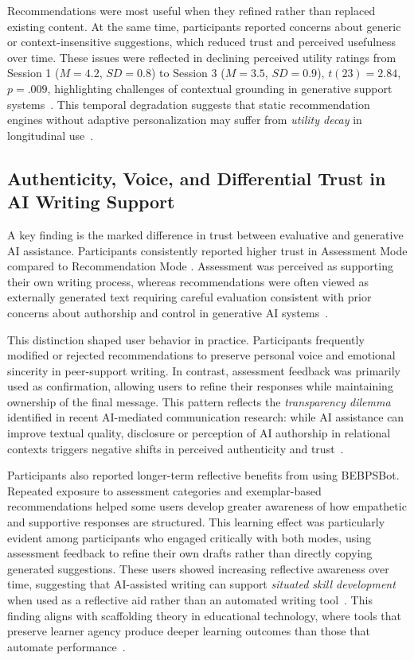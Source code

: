 \documentclass[]{llncs}
\begin{document}
Recommendations were most useful when they refined rather than replaced existing content. At the same time, participants reported concerns about generic or context-insensitive suggestions, which reduced trust and perceived usefulness over time. These issues were reflected in declining perceived utility ratings from Session 1 ($M = 4.2$, $SD = 0.8$) to Session 3 ($M = 3.5$, $SD = 0.9$), $t(23) = 2.84$, $p = .009$, highlighting challenges of contextual grounding in generative support systems~\cite{Heersmink2024,Shen2024}. This temporal degradation suggests that static recommendation engines without adaptive personalization may suffer from \textit{utility decay} in longitudinal use~\cite{Wang2025PeerCounseling}.

\subsection{Authenticity, Voice, and Differential Trust in AI Writing Support}
A key finding is the marked difference in trust between evaluative and generative AI assistance. Participants consistently reported higher trust in Assessment Mode compared to Recommendation Mode . Assessment was perceived as supporting their own writing process, whereas recommendations were often viewed as externally generated text requiring careful evaluation consistent with prior concerns about authorship and control in generative AI systems~\cite{Weisz2023,Liao2023}. 

This distinction shaped user behavior in practice. Participants frequently modified or rejected recommendations to preserve personal voice and emotional sincerity in peer-support writing. In contrast, assessment feedback was primarily used as confirmation, allowing users to refine their responses while maintaining ownership of the final message. This pattern reflects the \textit{transparency dilemma} identified in recent AI-mediated communication research: while AI assistance can improve textual quality, disclosure or perception of AI authorship in relational contexts triggers negative shifts in perceived authenticity and trust~\cite{Schilke2025,Jakesch2019}. 

Participants also reported longer-term reflective benefits from using BEBPSBot. Repeated exposure to assessment categories and exemplar-based recommendations helped some users develop greater awareness of how empathetic and supportive responses are structured. This learning effect was particularly evident among participants who engaged critically with both modes, using assessment feedback to refine their own drafts rather than directly copying generated suggestions. These users showed increasing reflective awareness over time, suggesting that AI-assisted writing can support \textit{situated skill development} when used as a reflective aid rather than an automated writing tool~\cite{Sharma2023,Yang2024SocialSkill}. This finding aligns with scaffolding theory in educational technology, where tools that preserve learner agency produce deeper learning outcomes than those that automate performance~\cite{Wood2001Scaffolding}.
\end{document}
